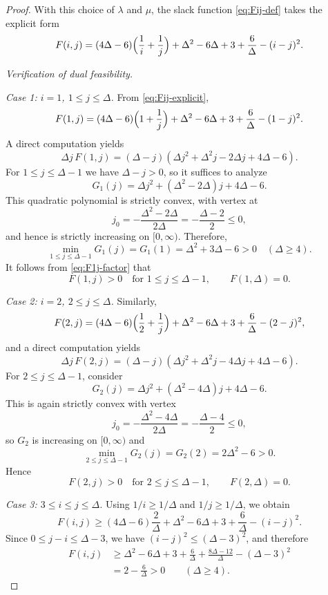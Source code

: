 \documentclass[10pt,a4paper]{amsart}
\begin{document}
\begin{proof}
With this choice of $\lambda$ and $\mu$, the slack function
\eqref{eq:Fij-def} takes the explicit form
\begin{equation}
\label{eq:Fij-explicit}
F(i,j)
=
(4\Delta-6)\Bigl(\frac{1}{i}+\frac{1}{j}\Bigr)
+ \Delta^2 - 6\Delta + 3 + \frac{6}{\Delta}
- (i-j)^2.
\end{equation}

\medskip\noindent
\emph{Verification of dual feasibility.}

\smallskip\noindent
\emph{Case 1: $i=1$, $1\le j\le \Delta$.}
From \eqref{eq:Fij-explicit},
\[
F(1,j)
=
(4\Delta-6)\Bigl(1+\frac{1}{j}\Bigr)
+ \Delta^2 - 6\Delta + 3 + \frac{6}{\Delta}
- (1-j)^2.
\]
A direct computation yields
\begin{equation}
\label{eq:F1j-factor}
\Delta j\,F(1,j)
=
(\Delta-j)
\left(
\Delta j^2 + \Delta^2 j - 2\Delta j + 4\Delta - 6
\right).
\end{equation}
For $1\le j\le \Delta-1$ we have $\Delta-j>0$, so it suffices to analyze
\[
G_1(j)
=
\Delta j^2 + (\Delta^2-2\Delta)j + 4\Delta - 6.
\]
This quadratic polynomial is strictly convex, with vertex at
\[
j_0=-\frac{\Delta^2-2\Delta}{2\Delta}=-\frac{\Delta-2}{2}\le 0,
\]
and hence is strictly increasing on $[0,\infty)$. Therefore,
\[
\min_{1\le j\le \Delta-1} G_1(j)=G_1(1)=\Delta^2+3\Delta-6>0
\quad(\Delta\ge 4).
\]
It follows from \eqref{eq:F1j-factor} that
\[
F(1,j)>0 \quad\text{for }1\le j\le \Delta-1,
\qquad
F(1,\Delta)=0.
\]

\smallskip\noindent
\emph{Case 2: $i=2$, $2\le j\le \Delta$.}
Similarly,
\[
F(2,j)
=
(4\Delta-6)\Bigl(\frac12+\frac{1}{j}\Bigr)
+ \Delta^2 - 6\Delta + 3 + \frac{6}{\Delta}
- (2-j)^2,
\]
and a direct computation yields
\begin{equation}
\label{eq:F2j-factor}
\Delta j\,F(2,j)
=
(\Delta-j)
\left(
\Delta j^2 + \Delta^2 j - 4\Delta j + 4\Delta - 6
\right).
\end{equation}
For $2\le j\le \Delta-1$, consider
\[
G_2(j)
=
\Delta j^2 + (\Delta^2-4\Delta)j + 4\Delta - 6.
\]
This is again strictly convex with vertex
\[
j_0=-\frac{\Delta^2-4\Delta}{2\Delta}=-\frac{\Delta-4}{2}\le 0,
\]
so $G_2$ is increasing on $[0,\infty)$ and
\[
\min_{2\le j\le \Delta-1} G_2(j)=G_2(2)=2\Delta^2-6>0.
\]
Hence
\[
F(2,j)>0 \quad\text{for }2\le j\le \Delta-1,
\qquad
F(2,\Delta)=0.
\]

\smallskip\noindent
\emph{Case 3: $3\le i\le j\le \Delta$.}
Using $1/i\ge 1/\Delta$ and $1/j\ge 1/\Delta$, we obtain
\[
F(i,j)
\ge
(4\Delta-6)\frac{2}{\Delta}
+ \Delta^2 - 6\Delta + 3 + \frac{6}{\Delta}
- (i-j)^2.
\]
Since $0\le j-i\le \Delta-3$, we have $(i-j)^2\le (\Delta-3)^2$, and therefore
\begin{align*}
F(i,j)
&\ge
\Delta^2 - 6\Delta + 3 + \frac{6}{\Delta}
+ \frac{8\Delta-12}{\Delta}
- (\Delta-3)^2\\
&=
2-\frac{6}{\Delta}>0
\qquad(\Delta\ge 4).
\end{align*}


\end{proof}
\end{document}
